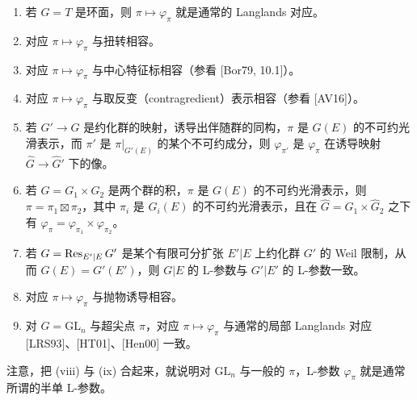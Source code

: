 \begin{theorem}%
\begin{enumerate}
\item[(i)] 若 $G=T$ 是环面，则 $\pi\mapsto\varphi_\pi$ 就是通常的 Langlands 对应。
\item[(ii)] 对应 $\pi\mapsto\varphi_\pi$ 与扭转相容。
\item[(iii)] 对应 $\pi\mapsto\varphi_\pi$ 与中心特征标相容（参看 [Bor79, 10.1]）。
\item[(iv)] 对应 $\pi\mapsto\varphi_\pi$ 与取反变（contragredient）表示相容（参看 [AV16]）。
\item[(v)] 若 $G'\to G$ 是约化群的映射，诱导出伴随群的同构，$\pi$ 是 $G(E)$ 的不可约光滑表示，而 $\pi'$ 是 $\pi|_{G'(E)}$ 的某个不可约成分，则 $\varphi_{\pi'}$ 是 $\varphi_\pi$ 在诱导映射 $\hat G\to\hat G'$ 下的像。
\item[(vi)] 若 $G=G_1\times G_2$ 是两个群的积，$\pi$ 是 $G(E)$ 的不可约光滑表示，则 $\pi=\pi_1\boxtimes\pi_2$，其中 $\pi_i$ 是 $G_i(E)$ 的不可约光滑表示，且在 $\hat G=\hat G_1\times\hat G_2$ 之下有 $\varphi_\pi=\varphi_{\pi_1}\times\varphi_{\pi_2}$。
\item[(vii)] 若 $G=\operatorname{Res}_{E'|E}G'$ 是某个有限可分扩张 $E'|E$ 上约化群 $G'$ 的 Weil 限制，从而 $G(E)=G'(E')$，则 $G|E$ 的 L-参数与 $G'|E'$ 的 L-参数一致。
\item[(viii)] 对应 $\pi\mapsto\varphi_\pi$ 与抛物诱导相容。
\item[(ix)] 对 $G=\mathrm{GL}_n$ 与超尖点 $\pi$，对应 $\pi\mapsto\varphi_\pi$ 与通常的局部 Langlands 对应 [LRS93]、[HT01]、[Hen00] 一致。
\end{enumerate}
\end{theorem}


注意，把 (viii) 与 (ix) 合起来，就说明对 $\mathrm{GL}_n$ 与一般的 $\pi$，L-参数 $\varphi_\pi$ 就是通常所谓的半单 L-参数。
